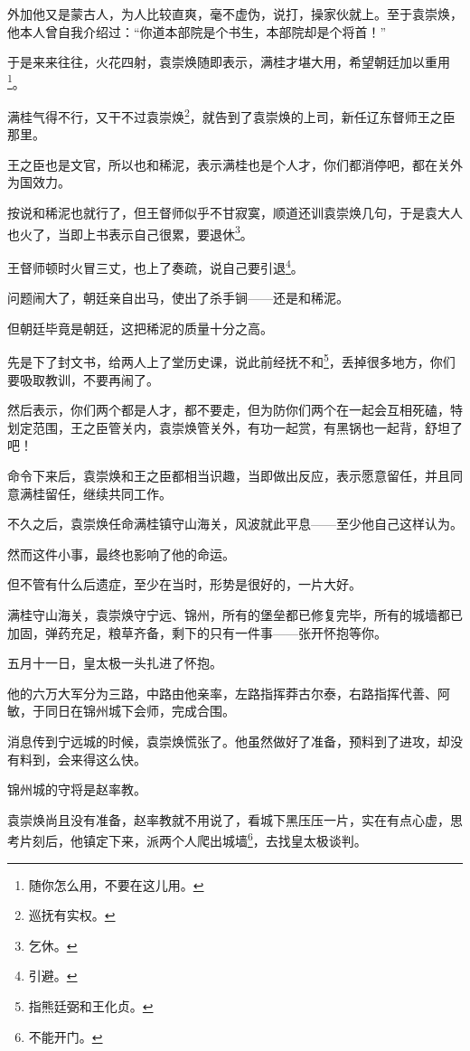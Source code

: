 \begin{multicols}{\theparacolNo}
		外加他又是蒙古人，为人比较直爽，毫不虚伪，说打，操家伙就上。至于袁崇焕，他本人曾自我介绍过：“你道本部院是个书生，本部院却是个将首！”

		于是来来往往，火花四射，袁崇焕随即表示，满桂才堪大用，希望朝廷加以重用\footnote{随你怎么用，不要在这儿用。}。

		满桂气得不行，又干不过袁崇焕\footnote{巡抚有实权。}，就告到了袁崇焕的上司，新任辽东督师王之臣那里。

		王之臣也是文官，所以也和稀泥，表示满桂也是个人才，你们都消停吧，都在关外为国效力。

		按说和稀泥也就行了，但王督师似乎不甘寂寞，顺道还训袁崇焕几句，于是袁大人也火了，当即上书表示自己很累，要退休\footnote{乞休。}。

		王督师顿时火冒三丈，也上了奏疏，说自己要引退\footnote{引避。}。

		问题闹大了，朝廷亲自出马，使出了杀手锏——还是和稀泥。

		但朝廷毕竟是朝廷，这把稀泥的质量十分之高。

		先是下了封文书，给两人上了堂历史课，说此前经抚不和\footnote{指熊廷弼和王化贞。}，丢掉很多地方，你们要吸取教训，不要再闹了。

		然后表示，你们两个都是人才，都不要走，但为防你们两个在一起会互相死磕，特划定范围，王之臣管关内，袁崇焕管关外，有功一起赏，有黑锅也一起背，舒坦了吧！

		命令下来后，袁崇焕和王之臣都相当识趣，当即做出反应，表示愿意留任，并且同意满桂留任，继续共同工作。

		不久之后，袁崇焕任命满桂镇守山海关，风波就此平息——至少他自己这样认为。

		然而这件小事，最终也影响了他的命运。

		但不管有什么后遗症，至少在当时，形势是很好的，一片大好。

		满桂守山海关，袁崇焕守宁远、锦州，所有的堡垒都已修复完毕，所有的城墙都已加固，弹药充足，粮草齐备，剩下的只有一件事——张开怀抱等你。

		五月十一日，皇太极一头扎进了怀抱。

		他的六万大军分为三路，中路由他亲率，左路指挥莽古尔泰，右路指挥代善、阿敏，于同日在锦州城下会师，完成合围。

		消息传到宁远城的时候，袁崇焕慌张了。他虽然做好了准备，预料到了进攻，却没有料到，会来得这么快。

		锦州城的守将是赵率教。

		袁崇焕尚且没有准备，赵率教就不用说了，看城下黑压压一片，实在有点心虚，思考片刻后，他镇定下来，派两个人爬出城墙\footnote{不能开门。}，去找皇太极谈判。


\end{multicols}
